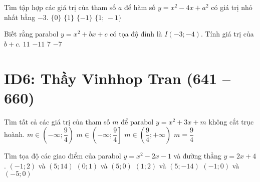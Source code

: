 \begin{ex}%
	Tìm tập hợp các giá trị của tham số $a$ để hàm số $y=x^2-4x+a^2$  có giá trị nhỏ nhất bằng $-3$.
	\choice
	{$\{0\}$}
	{$\{1\}$}
	{$\{-1\}$}
	{\True $\{1; \, -1\}$}
\end{ex}

\begin{ex}%
	Biết rằng parabol $y=x^2+bx+c$ có tọa độ đỉnh là $I(-3;-4)$. Tính giá trị của $b+c$.
	\choice
	{\True $11$}
	{$-11$}
	{$7$}
	{$-7$}
\end{ex}



\section*{ID6: Thầy Vinhhop Tran (641 -- 660)}
\begin{ex}%
	Tìm tất cả các giá trị của tham số $m$ để parabol $y=x^2+3x+m$ không cắt trục hoành.
	\choice
	{$m\in\left(-\infty;\dfrac{9}{4}\right)$}
	{$m\in\left(-\infty;\dfrac{9}{4}\right]$}
	{\True $m\in\left(\dfrac{9}{4};+\infty\right)$}
	{$m=\dfrac{9}{4}$}
\end{ex}

\begin{ex}%
	Tìm tọa độ các giao điểm của parabol $y=x^2-2x-1$ và đường thẳng $y=2x+4$.
	\choice
	{\True $(-1;2)$ và $(5;14)$}
	{$(0;1)$ và $(5;0)$}
	{$(1;2)$ và $(5;-14)$}
	{$(-1;0)$ và $(-5;0)$}
\end{ex}

